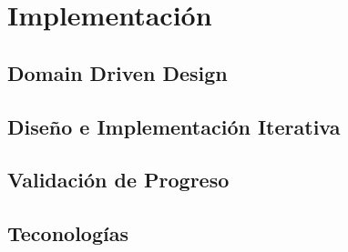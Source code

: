 \chapter{Implementación}
 
\section{Domain Driven Design}

\section{Diseño e Implementación Iterativa}

\section{Validación de Progreso}

\section{Teconologías}